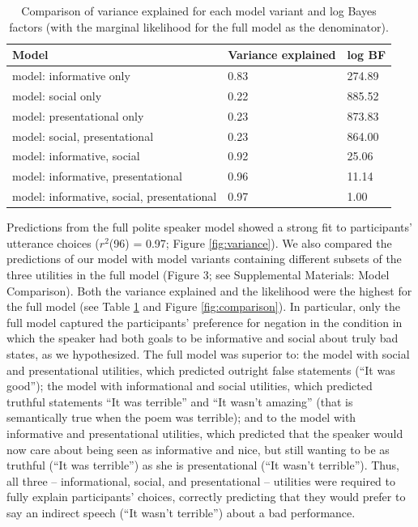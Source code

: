 \documentclass[floatsintext,man]{apa6}
\theoremstyle{definition}
\theoremstyle{definition}
\theoremstyle{definition}
\theoremstyle{remark}
\begin{document}
\begin{table}[tbp]
\begin{center}
\begin{threeparttable}
\caption{\label{tab:comparisonTable}Comparison of variance explained for each model variant and log Bayes factors (with the marginal likelihood for the full model as the denominator).
}
\begin{tabular}{lll}
\toprule
Model & \multicolumn{1}{c}{Variance 
explained} & \multicolumn{1}{c}{log BF}\\
\midrule
model: 
informative only & 0.83 & 274.89\\
model: 
social only & 0.22 & 885.52\\
model: 
presentational 
only & 0.23 & 873.83\\
model: 
social, 
presentational & 0.23 & 864.00\\
model: 
informative, 
social & 0.92 & 25.06\\
model: 
informative, 
presentational & 0.96 & 11.14\\
model: 
informative, 
social, 
presentational & 0.97 & 1.00\\
\bottomrule
\end{tabular}
\end{threeparttable}
\end{center}
\end{table}

Predictions from the full polite speaker model showed a strong fit to
participants' utterance choices (\(r^2\)(96) = 0.97; Figure
\ref{fig:variance}). We also compared the predictions of our model with
model variants containing different subsets of the three utilities in
the full model (Figure 3; see Supplemental Materials: Model Comparison).
Both the variance explained and the likelihood were the highest for the
full model (see Table \ref{tab:comparisonTable} and Figure
\ref{fig:comparison}). In particular, only the full model captured the
participants' preference for negation in the condition in which the
speaker had both goals to be informative and social about truly bad
states, as we hypothesized. The full model was superior to: the model
with social and presentational utilities, which predicted outright false
statements (\enquote{It was good}); the model with informational and
social utilities, which predicted truthful statements \enquote{It was
terrible} and \enquote{It wasn't amazing} (that is semantically true
when the poem was terrible); and to the model with informative and
presentational utilities, which predicted that the speaker would now
care about being seen as informative and nice, but still wanting to be
as truthful (\enquote{It was terrible}) as she is presentational
(\enquote{It wasn't terrible}). Thus, all three -- informational,
social, and presentational -- utilities were required to fully explain
participants' choices, correctly predicting that they would prefer to
say an indirect speech (\enquote{It wasn't terrible}) about a bad
performance.
\end{document}
